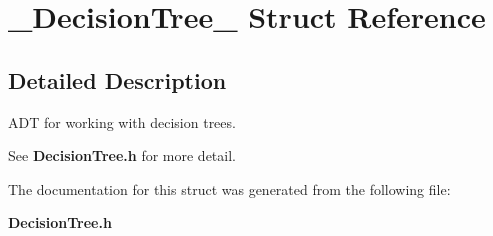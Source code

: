 \section{\_\-Decision\-Tree\_\- Struct Reference}
\label{struct__DecisionTree__}


\subsection{Detailed Description}
ADT for working with decision trees. 

See {\bf Decision\-Tree.h} for more detail. 



The documentation for this struct was generated from the following file:\begin{CompactItemize}
\item 
{\bf Decision\-Tree.h}\end{CompactItemize}

